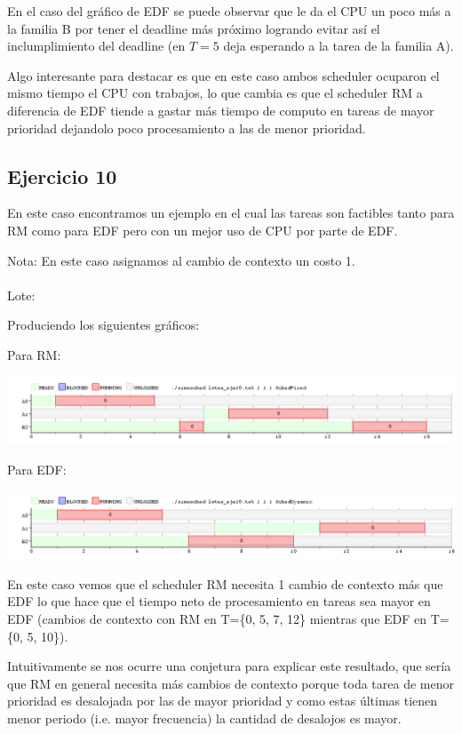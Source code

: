 En el caso del gráfico de EDF se puede observar que le da el CPU un poco más a la familia B por tener el deadline más próximo logrando evitar así el inclumplimiento del deadline (en $T=5$ deja esperando a la tarea de la familia A).

Algo interesante para destacar es que en este caso ambos scheduler ocuparon el mismo tiempo el CPU con trabajos, lo que cambia es que el scheduler RM a diferencia de EDF tiende a gastar más tiempo de computo en tareas de mayor prioridad dejandolo poco procesamiento a las de menor prioridad.

\subsection{Ejercicio 10}

En este caso encontramos un ejemplo en el cual las tareas son factibles tanto para RM como para EDF pero con un mejor uso de CPU por parte de EDF.

Nota: En este caso asignamos al cambio de contexto un costo 1.
\\
\\
Lote:


Produciendo los siguientes gráficos:

Para RM:

\begin{center}
\includegraphics[scale=0.4]{graficos/eje10_Fixed.png}
\end{center}

Para EDF:

\begin{center}
\includegraphics[scale=0.4]{graficos/eje10_Dynamic.png}
\end{center}

En este caso vemos que el scheduler RM necesita 1 cambio de contexto más que EDF lo que hace que el tiempo neto de procesamiento en tareas sea mayor en EDF (cambios de contexto con RM en T=\{0, 5, 7, 12\} mientras que EDF en T=\{0, 5, 10\}).

Intuitivamente se nos ocurre una conjetura para explicar este resultado, que sería que RM en general necesita más cambios de contexto porque toda tarea de menor prioridad es desalojada por las de mayor prioridad y como estas últimas tienen menor periodo (i.e. mayor frecuencia) la cantidad de desalojos es mayor.






